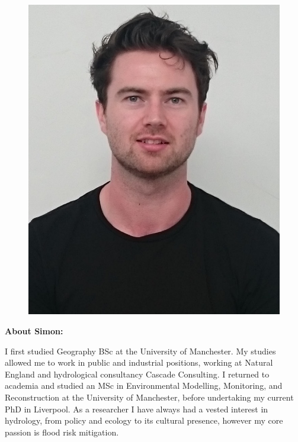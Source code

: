 \documentclass[11pt]{article}%
\begin{document}
\begin{minipage}[t]{.24\linewidth}
\vspace{10pt}
\begin{mdframed}[style=about,frametitle={}] %

\begin{figure}[H]
\includegraphics[width=1\linewidth]{simon/simonPict.jpg}
\end{figure}

\vspace{-10pt}

{\textbf{\large About Simon:}}

\begin{scriptsize}

I first studied Geography BSc at the University of Manchester. My studies allowed me to work in public and industrial positions, working at Natural England and hydrological consultancy Cascade Consulting. I returned to academia and studied an MSc in Environmental Modelling, Monitoring, and Reconstruction at the University of Manchester, before undertaking my current PhD in Liverpool. As a researcher I have always had a vested interest in hydrology, from policy and ecology to its cultural presence, however my core passion is flood risk mitigation.


\end{scriptsize}
\end{mdframed}
\end{minipage}
\end{document}
